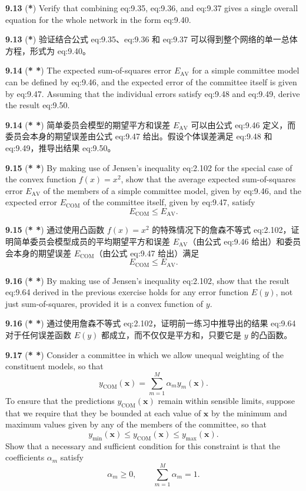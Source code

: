 \documentclass{article}
\begin{document}
\textbf{9.13} (\textbf{*}) Verify that combining {eq:9.35}, {eq:9.36}, and {eq:9.37} gives a single overall equation for the whole network in the form {eq:9.40}.

\textbf{9.13} (\textbf{*}) 验证结合公式 {eq:9.35}、{eq:9.36} 和 {eq:9.37} 可以得到整个网络的单一总体方程，形式为 {eq:9.40}。

\textbf{9.14} (\textbf{* *}) The expected sum-of-squares error $E_\text{AV}$ for a simple committee model can be defined by {eq:9.46}, and the expected error of the committee itself is given by {eq:9.47}. Assuming that the individual errors satisfy {eq:9.48} and {eq:9.49}, derive the result {eq:9.50}.

\textbf{9.14} (\textbf{* *}) 简单委员会模型的期望平方和误差 $E_\text{AV}$ 可以由公式 {eq:9.46} 定义，而委员会本身的期望误差由公式 {eq:9.47} 给出。假设个体误差满足 {eq:9.48} 和 {eq:9.49}，推导出结果 {eq:9.50}。

\textbf{9.15} (\textbf{* *}) By making use of Jensen's inequality {eq:2.102} for the special case of the convex function $f(x) = x^2$, show that the average expected sum-of-squares error $E_\text{AV}$ of the members of a simple committee model, given by {eq:9.46}, and the expected error $E_\text{COM}$ of the committee itself, given by {eq:9.47}, satisfy
\[
E_\text{COM} \leqslant E_\text{AV}.
\]

\textbf{9.15} (\textbf{* *}) 通过使用凸函数 $f(x) = x^2$ 的特殊情况下的詹森不等式 {eq:2.102}，证明简单委员会模型成员的平均期望平方和误差 $E_\text{AV}$（由公式 {eq:9.46} 给出）和委员会本身的期望误差 $E_\text{COM}$（由公式 {eq:9.47} 给出）满足
\[
E_\text{COM} \leqslant E_\text{AV}.
\]

\textbf{9.16} (\textbf{* *}) By making use of Jensen's inequality {eq:2.102}, show that the result {eq:9.64} derived in the previous exercise holds for any error function $E(y)$, not just sum-of-squares, provided it is a convex function of $y$.

\textbf{9.16} (\textbf{* *}) 通过使用詹森不等式 {eq:2.102}，证明前一练习中推导出的结果 {eq:9.64} 对于任何误差函数 $E(y)$ 都成立，而不仅仅是平方和，只要它是 $y$ 的凸函数。

\textbf{9.17} (\textbf{* *}) Consider a committee in which we allow unequal weighting of the constituent models, so that
\[
y_\text{COM}(\mathbf{x}) = \sum_{m=1}^{M} \alpha_m y_m(\mathbf{x}).
\]
To ensure that the predictions $y_\text{COM}(\mathbf{x})$ remain within sensible limits, suppose that we require that they be bounded at each value of $\mathbf{x}$ by the minimum and maximum values given by any of the members of the committee, so that
\[
y_{\min}(\mathbf{x}) \le y_{\text{COM}}(\mathbf{x}) \le y_{\max}(\mathbf{x}).\]
Show that a necessary and sufficient condition for this constraint is that the coefficients $\alpha_m$ satisfy
\[
\alpha_m \geqslant 0, \qquad \sum_{m=1}^{M} \alpha_m = 1.
\]
\end{document}
